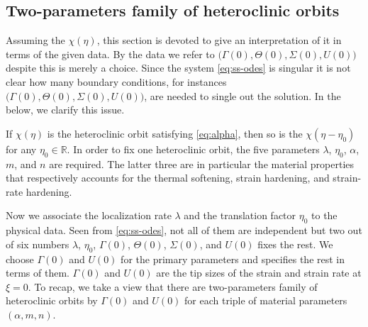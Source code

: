 \documentclass[a4paper,11pt]{article}
\begin{document}
\subsection{Two-parameters family of heteroclinic orbits}
Assuming the $\chi(\eta)$, this section is devoted to give an interpretation of it in terms of the given data. By the data we refer to $\big(\Gamma(0),\Theta(0),\Sigma(0),U(0)\big)$ despite this is merely a choice. Since the system \eqref{eq:ss-odes} is singular it is not clear how many boundary conditions, for instances $\big(\Gamma(0),\Theta(0),\Sigma(0),U(0)\big)$, are needed to single out the solution. In the below, we clarify this issue.

If $\chi(\eta)$ is the heteroclinic orbit satisfying \eqref{eq:alpha}, then so is the $\chi(\eta-\eta_0)$ for any $\eta_0\in \mathbb{R}$. In order to fix one heteroclinic orbit, the five parameters $\lambda$, $\eta_0$, $\alpha$, $m$, and $n$ are required. The latter three are in particular the material properties that respectively accounts for the thermal softening, strain hardening, and strain-rate hardening.

Now we associate the localization rate $\lambda$  and the translation factor $\eta_0$  to the physical data. Seen from \eqref{eq:ss-odes}, not all of them are independent but two out of six numbers $\lambda$, $\eta_0$, $\Gamma(0)$, $\Theta(0)$, $\Sigma(0)$, and $U(0)$ fixes the rest. We choose $\Gamma(0)$ and $U(0)$ for the primary parameters and specifies the rest in terms of them. $\Gamma(0)$ and $U(0)$ are the tip sizes of the strain and strain rate at $\xi=0$. To recap, we take a view that there are two-parameters family of heteroclinic orbits by $\Gamma(0)$ and $U(0)$ for each triple of material parameters $(\alpha,m,n)$.
\end{document}
